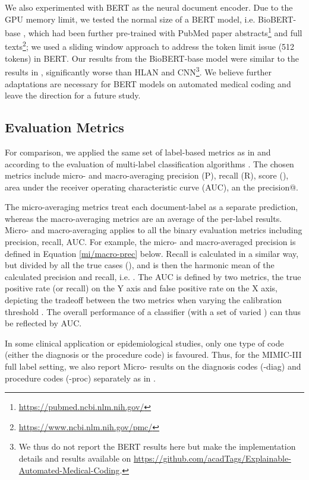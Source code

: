 \documentclass[final,5p,times,twocolumn]{elsarticle}
\begin{document}
We also experimented with BERT as the neural document encoder. Due to the GPU memory limit, we tested the normal size of a BERT model, i.e. BioBERT-base \cite{Lee2019BioBert}, which had been further pre-trained with PubMed paper abstracts\footnote{\url{https://pubmed.ncbi.nlm.nih.gov/}} and full texts\footnote{\url{https://www.ncbi.nlm.nih.gov/pmc/}}; we used a sliding window approach to address the token limit issue (512 tokens) in BERT. Our results from the BioBERT-base model were similar to the results in \cite{Chen2020icd9bert}, significantly worse than HLAN and CNN\footnote{We thus do not report the BERT results here but make the implementation details and results available on \url{https://github.com/acadTags/Explainable-Automated-Medical-Coding}.}. We believe further adaptations are necessary for BERT models on automated medical coding and leave the direction for a future study.

\subsection{Evaluation Metrics}
\label{metrics}
For comparison, we applied the same set of label-based metrics as in \cite{mullenbach-etal-2018-explainable} and according to the evaluation of multi-label classification algorithms \cite{Tsoumakas2010,zhang2014}. The chosen metrics include micro- and macro-averaging precision (P), recall (R),  score (), area under the receiver operating characteristic curve (AUC), an the precision@.

The micro-averaging metrics treat each document-label as a separate prediction, whereas the macro-averaging metrics are an average of the per-label results. Micro- and macro-averaging applies to all the binary evaluation metrics including precision, recall, AUC. For example, the micro- and macro-averaged precision is defined in Equation \ref{mi/macro-prec} below. Recall is calculated in a similar way, but divided by all the true cases (), and  is then the harmonic mean of the calculated precision and recall, i.e. . The AUC is defined by two metrics, the true positive rate (or recall) on the Y axis and false positive rate on the X axis, depicting the tradeoff between the two metrics when varying the calibration threshold  \cite{fawcett2006}. The overall performance of a classifier (with a set of varied ) can thus be reflected by AUC.


In some clinical application or epidemiological studies, only one type of code (either the diagnosis or the procedure code) is favoured. Thus, for the MIMIC-III full label setting, we also report Micro- results on the diagnosis codes (-diag) and procedure codes (-proc) separately as in \cite{mullenbach-etal-2018-explainable}. 
\end{document}
